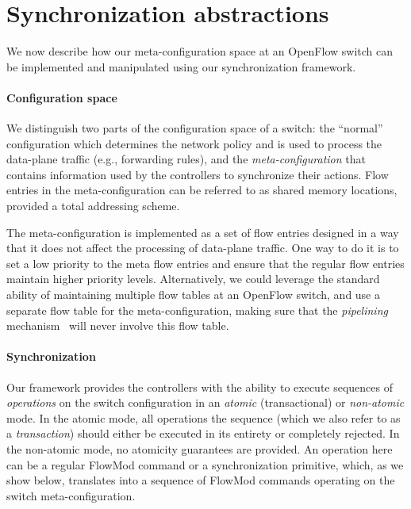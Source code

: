 \documentclass[conference]{sigcomm-alternate}
\newcommand{\petr}[1]{\textit{\textcolor{blue}{[petr]: #1}}} %
\begin{document}

\section{Synchronization abstractions}\label{sec:main}

We now describe how our  meta-configuration space at
an OpenFlow switch can be implemented and manipulated using our
synchronization framework. 


\paragraph{Configuration space}
%
We distinguish two parts of the configuration space of a switch:
the ``normal'' configuration which determines the network policy and
is used to process the data-plane traffic (e.g., forwarding rules), 
and the \emph{meta-configuration} that contains information used by the
controllers to synchronize their actions.
Flow entries in the meta-configuration can be referred to as shared
memory locations, provided a total addressing scheme. 

The meta-configuration is implemented as a set of flow entries
designed in a way that it does not affect the processing of data-plane
traffic. One way to do it is to set a low priority to
the meta flow entries and ensure that the regular flow entries
maintain higher priority levels.
Alternatively, we could leverage the standard ability of maintaining multiple
flow tables at an OpenFlow switch, and use a separate flow table for
the meta-configuration,  making sure that the
\emph{pipelining} mechanism~\cite{of-spec} will never involve this
flow table. 
 
  


\paragraph{Synchronization}
Our framework provides the controllers with the ability to execute
sequences of \emph{operations} on the 
switch configuration in an \emph{atomic} (transactional) or \emph{non-atomic} mode.     
In the atomic mode, all operations the sequence (which we also refer
to as a \emph{transaction}) 
should either be executed in its entirety or completely rejected. 
In the non-atomic mode, no atomicity guarantees are provided. 
An operation here can be a regular FlowMod command or a synchronization
primitive, which, as we
show below, translates into a sequence of FlowMod commands operating on the
switch meta-configuration. 
\end{document}
